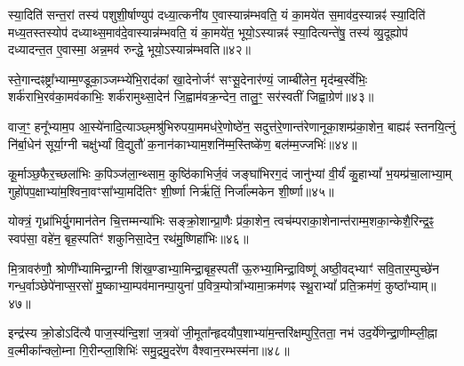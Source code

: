 स्या॒दिति॑ सन्त॒रां तस्य॑ पशुशी॒र्\mbox{}षाण्युप॑ दध्या॒त्कनी॑य ए॒वास्यान्न॑म्भवति॒ यं का॒मये॑त स॒माव॑द॒स्यान्नꣴ॑ स्या॒दिति॑ मध्य॒तस्तस्योप॑ दध्याथ्स॒माव॑दे॒वास्यान्न॑म्भवति॒ यं का॒मये॑त॒ भूयो॒\-ऽस्यान्नꣴ॑ स्या॒दित्यन्ते॑षु॒ तस्य॑ व्यु॒दूह्योप॑ दध्यादन्त॒त ए॒वास्मा॒ अन्न॒मव॑ रुन्द्धे॒ भूयो॒\-ऽस्यान्न॑म्भवति॥४२॥

{\anuvakamend[{ए॒न॒म॒स्यान्न॒म्भूयो॒स्यान्न॑म्भवति॥10॥}]}

स्ते॒गान्दꣴष्ट्रा᳚भ्याम्म॒ण्डूका॒ञ्जम्भ्ये॑भि॒राद॑कां खा॒देनोर्जꣳ॑ सꣳसू॒देनार॑ण्यं॒ जाम्बी॑लेन॒ मृद॑म्ब॒र्स्वे॑भिः॒ शर्क॑राभि॒रव॑का॒मव॑काभिः॒ शर्क॑रामुथ्सा॒देन॑ जि॒ह्वाम॑वक्र॒न्देन॒ तालु॒ꣳ॒ सर॑स्वतीं जिह्वा॒ग्रेण॑॥४३॥

{\anuvakamend[{स्ते॒गान्द्वाविꣳ॑शतिः॥11॥}]}

वाज॒ꣳ॒ हनू᳚भ्याम॒प आ॒स्ये॑नादि॒त्याञ्छ्मश्रु॑भिरुपया॒ममध॑रे॒णोष्ठे॑न॒ सदुत्त॑रे॒णान्त॑रेणानूका॒शम्प्र॑का॒शेन॒ बाह्यꣴ॑ स्तनयि॒त्नुं नि॑र्बा॒धेन॑ सूर्या॒ग्नी चक्षु॑र्भ्यां वि॒द्युतौ॑ क॒नान॑काभ्याम॒शनि॑म्म॒स्तिष्के॑ण॒ बल॑म्म॒ज्जभिः॑॥४४॥

{\anuvakamend[{वाजं॒ पञ्च॑विꣳशतिः॥12॥}]}

कू॒र्माञ्छ॒फैर॒च्छला॑भिः क॒पिञ्ज॑ला॒न्थ्साम॒ कुष्ठि॑काभिर्ज॒वं जङ्घा॑भिरग॒दं जानु॑भ्यां वी॒र्यं॑ कु॒हा\-भ्यां᳚ भ॒यम्प्र॑चा॒लाभ्या॒म् गुहो॑पप॒क्षाभ्या॑म॒श्विना॒वꣳसा᳚भ्या॒मदि॑तिꣳ शी॒र्ष्णा निर्\mbox{}ऋ॑तिं॒ निर्जा᳚ल्मकेन शी॒र्ष्णा॥४५॥

{\anuvakamend[{कू॒र्मान्त्रयो॑विꣳशतिः॥13॥}]}

योक्त्रं॒ गृध्रा॑भिर्यु॒गमान॑तेन चि॒त्तम्मन्या॑भिः सङ्क्रो॒शान्प्रा॒णैः प्र॑का॒शेन॒ त्वच॑म्पराका॒शेनान्त॑राम्म॒शका॒न्केशै॒रिन्द्र॒ꣴ॒ स्वप॑सा॒ वहे॑न॒ बृह॒स्पतिꣳ॑ शकुनिसा॒देन॒ रथ॑मु॒ष्णिहा॑भिः॥४६॥

{\anuvakamend[{योक्त्र॒मेक॑विꣳशतिः॥14॥}]}

मि॒त्रावरु॑णौ॒ श्रोणी᳚भ्यामिन्द्रा॒ग्नी शि॑ख॒ण्डाभ्या॒मिन्द्रा॒बृह॒स्पती॑ ऊ॒रुभ्या॒मिन्द्रा॒विष्णू॑ अष्ठी॒वद्भ्याꣳ॑ सवि॒तार॒म्पुच्छे॑न गन्ध॒र्वाञ्छेपे॑नाप्स॒रसो॑ मु॒ष्काभ्या॒म्पव॑मानम्पा॒युना॑ प॒वित्र॒म्पोत्रा᳚भ्यामा॒क्रम॑णꣴ स्थू॒रा\-भ्यां᳚ प्रति॒क्रम॑णं॒ कुष्ठा᳚भ्याम्॥४७॥

{\anuvakamend[{॥15॥}]}

इन्द्र॑स्य क्रो॒डो\-ऽदि॑त्यै पाज॒स्य॑न्दि॒शां ज॒त्रवो॑ जी॒मूता᳚न्हृदयौप॒शाभ्या॑म॒न्तरि॑क्षम्पुरि॒तता॒ नभ॑ उद॒र्ये॑णेन्द्रा॒णीम्प्ली॒ह्ना व॒ल्मीका᳚न्क्लो॒म्ना गि॒रीन्प्ला॒शिभिः॑ समु॒द्रमु॒दरे॑ण वैश्वान॒रम्भस्म॑ना॥४८॥

{\anuvakamend[{मि॒त्रावरु॑णा॒विन्द्र॑स्य॒ द्वाविꣳ॑शति॒र्द्वाविꣳ॑शतिः॥16॥}]}

